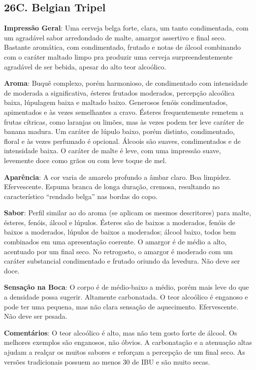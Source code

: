 \subsection*{26C. Belgian Tripel}
\textbf{Impressão Geral}: Uma cerveja belga forte, clara, um tanto condimentada, com um agradável sabor arredondado de malte, amargor assertivo e final seco. Bastante aromática, com condimentado, frutado e notas de álcool combinando com o caráter maltado limpo pra produzir uma cerveja surpreendentemente agradável de ser bebida, apesar do alto teor alcoólico.

\textbf{Aroma}: Buquê complexo, porém harmonioso, de condimentado com intensidade de moderada a significativa, ésteres frutados moderados, percepção alcoólica baixa, lúpulagem baixa e maltado baixo. Generosos fenóis condimentados, apimentados e às vezes semelhantes a cravo. Ésteres frequentemente remetem a frutas cítricas, como laranjas ou limões, mas às vezes podem ter leve caráter de banana madura. Um caráter de lúpulo baixo, porém distinto, condimentado, floral e às vezes perfumado é opcional. Álcoois são suaves, condimentados e de intensidade baixa. O caráter de malte é leve, com uma impressão suave, levemente doce como grãos ou com leve toque de mel.

\textbf{Aparência}: A cor varia de amarelo profundo a âmbar claro. Boa limpidez. Efervescente. Espuma branca de longa duração, cremosa, resultando no característico “rendado belga” nas bordas do copo.

\textbf{Sabor}: Perfil similar ao do aroma (se aplicam os mesmos descritores) para malte, ésteres, fenóis, álcool e lúpulos. Ésteres são de baixos a moderados, fenóis de baixos a moderados, lúpulos de baixos a moderados; álcool baixo, todos bem combinados em uma apresentação coerente. O amargor é de médio a alto, acentuado por um final seco. No retrogosto, o amargor é moderado com um caráter substancial condimentado e frutado oriundo da levedura. Não deve ser doce.

\textbf{Sensação na Boca}: O corpo é de médio-baixo a médio, porém mais leve do que a densidade possa sugerir. Altamente carbonatada. O teor alcoólico é enganoso e pode ter uma pequena, mas não clara sensação de aquecimento. Efervescente. Não deve ser pesada.

\textbf{Comentários}: O teor alcoólico é alto, mas não tem gosto forte de álcool. Os melhores exemplos são enganosos, não óbvios. A carbonatação e a atenuação altas ajudam a realçar os muitos sabores e reforçam a percepção de um final seco. As versões tradicionais possuem ao menos 30 de IBU e são muito secas.

